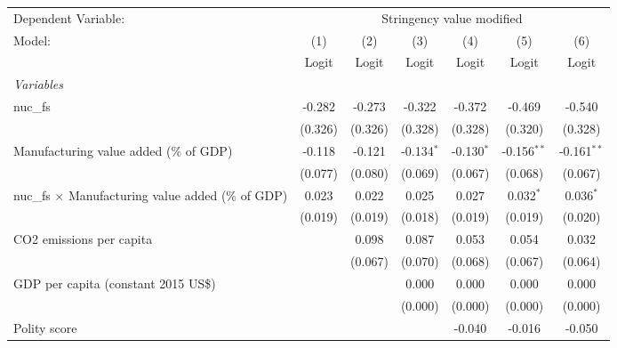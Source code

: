 
\begingroup
\centering
\begin{tabular}{lcccccc}
   \toprule
   Dependent Variable: & \multicolumn{6}{c}{Stringency value modified}\\
   Model:                                                    & (1)     & (2)     & (3)          & (4)          & (5)           & (6)\\  
                                                             &  Logit  & Logit   & Logit        & Logit        & Logit         & Logit\\  
   \midrule
   \emph{Variables}\\
   nuc\_fs                                                   & -0.282  & -0.273  & -0.322       & -0.372       & -0.469        & -0.540\\   
                                                             & (0.326) & (0.326) & (0.328)      & (0.328)      & (0.320)       & (0.328)\\   
   Manufacturing value added (\% of GDP)                     & -0.118  & -0.121  & -0.134$^{*}$ & -0.130$^{*}$ & -0.156$^{**}$ & -0.161$^{**}$\\   
                                                             & (0.077) & (0.080) & (0.069)      & (0.067)      & (0.068)       & (0.067)\\   
   nuc\_fs $\times$ Manufacturing value added (\% of GDP)    & 0.023   & 0.022   & 0.025        & 0.027        & 0.032$^{*}$   & 0.036$^{*}$\\   
                                                             & (0.019) & (0.019) & (0.018)      & (0.019)      & (0.019)       & (0.020)\\   
   CO2 emissions per capita                                  &         & 0.098   & 0.087        & 0.053        & 0.054         & 0.032\\   
                                                             &         & (0.067) & (0.070)      & (0.068)      & (0.067)       & (0.064)\\   
   GDP per capita (constant 2015 US\$)                       &         &         & 0.000        & 0.000        & 0.000         & 0.000\\   
                                                             &         &         & (0.000)      & (0.000)      & (0.000)       & (0.000)\\   
   Polity score                                              &         &         &              & -0.040       & -0.016        & -0.050\\   

\end{tabular}
